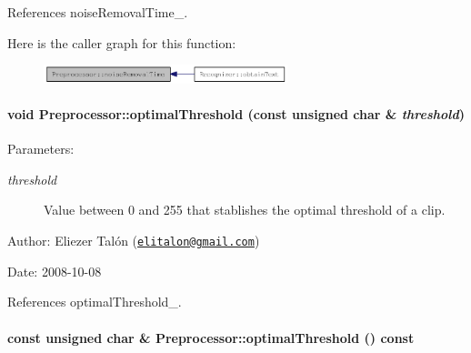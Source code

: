 References noiseRemovalTime\_\-.

Here is the caller graph for this function:\nopagebreak
\begin{figure}[H]
\begin{center}
\leavevmode
\includegraphics[width=201pt]{class_preprocessor_ff8eee937760e42c0c2bea307849ada1_icgraph}
\end{center}
\end{figure}
\hypertarget{class_preprocessor_1fc44d7d19944f3c3addd3a576c37414}{
\paragraph[{optimalThreshold}]{\setlength{\rightskip}{0pt plus 5cm}void Preprocessor::optimalThreshold (const unsigned char \& {\em threshold})}\hfill}
\label{class_preprocessor_1fc44d7d19944f3c3addd3a576c37414}


\begin{Desc}
\item[Parameters:]
\begin{description}
\item[{\em threshold}]Value between 0 and 255 that stablishes the optimal threshold of a clip.\end{description}
\end{Desc}
\begin{Desc}
\item[Author:]Eliezer Talón (\href{mailto:elitalon@gmail.com}{\tt elitalon@gmail.com}) \end{Desc}
\begin{Desc}
\item[Date:]2008-10-08 \end{Desc}


References optimalThreshold\_\-.\hypertarget{class_preprocessor_a44dff024a5b29752780bd4aa0d53d81}{
\paragraph[{optimalThreshold}]{\setlength{\rightskip}{0pt plus 5cm}const unsigned char \& Preprocessor::optimalThreshold () const}\hfill}
\label{class_preprocessor_a44dff024a5b29752780bd4aa0d53d81}


